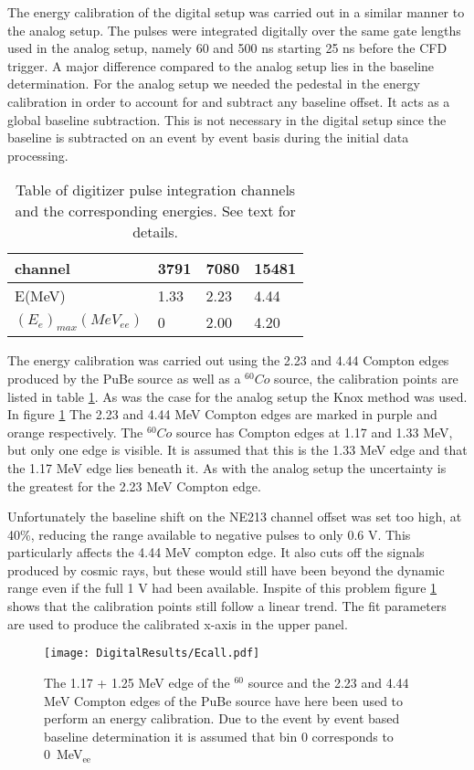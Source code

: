 \documentclass[main.tex]{subfiles}
\begin{document}
The energy calibration of the digital setup was carried out in a similar manner to the analog setup. The pulses were integrated digitally over the same gate lengths used in the analog setup, namely 60 and 500 ns starting 25 ns before the CFD trigger. A major difference compared to the analog setup lies in the baseline determination. For the analog setup we needed the pedestal in the energy calibration in order to account for and subtract any baseline offset. It acts as a global baseline subtraction. This is not necessary in the digital setup since the baseline is subtracted on an event by event basis during the initial data processing. 

\begin{table}[hb]
	\center
	\begin{tabular}{|l|l|l|l|}
	\hline
	channel            & 3791 & 7080  & 15481  \\
	\hline
	E(MeV)          & 1.33    & 2.23  & 4.44 \\
	\hline
	$(E_{e})_{max}(MeV_{ee})$ & 0    & 2.00  & 4.20 \\
	\hline
	\end{tabular}
   	\captionsetup{width=0.435\linewidth}
	\caption{Table of digitizer pulse integration channels and the corresponding energies. See text for details.}
	\label{tab:knox_d}
\end{table}

The energy calibration was carried out using the 2.23 and 4.44 Compton edges produced by the PuBe source as well as a $^{60}Co$ source, the calibration points are listed in table \ref{tab:knox_d}. As was the case for the analog setup the Knox method was used. In figure \ref{fig:D_QDC} The 2.23 and 4.44 \si{\MeV} Compton edges are marked in purple and orange respectively. The $^{60}Co$ source has Compton edges at 1.17 and 1.33 \si{\MeV}, but only one edge is visible. It is assumed that this is the 1.33 \si{\MeV} edge and that the 1.17 \si{\MeV} edge lies beneath it. As with the analog setup the uncertainty is the greatest for the 2.23 MeV Compton edge.

Unfortunately the baseline shift on the NE213 channel offset was set too high, at 40\%, reducing the range available to negative pulses to only 0.6 V. This particularly affects the 4.44 \si{\MeV} compton edge. It also cuts off the signals produced by cosmic rays, but these would still have been beyond the dynamic range even if the full 1 V had been available. Inspite of this problem figure \ref{fig:D_QDC} shows that the calibration points still follow a linear trend. The fit parameters are used to produce the calibrated x-axis in the upper panel.

\begin{figure}[ht]
    \centering
        \texttt{[image: DigitalResults/Ecall.pdf]}
        \caption[Energy calibration of the digital setup]{The 1.17 + 1.25 MeV edge of the $^60$ source and the 2.23 and 4.44 MeV Compton edges of the PuBe source have here been used to perform an energy calibration. Due to the event by event based baseline determination it is assumed that bin 0 corresponds to \SI{0}{\MeV}$_\text{ee}$}
    \label{fig:D_QDC}
\end{figure}
\end{document}

